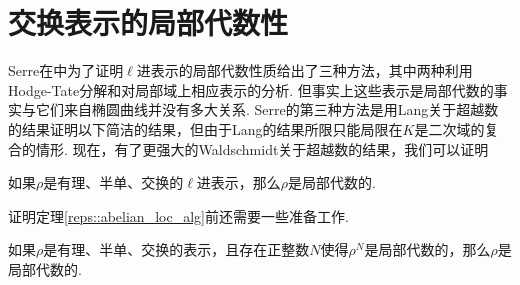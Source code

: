 \section{交换表示的局部代数性}

Serre在\parencite{serre1997abelian}中为了证明$\ell$进表示的局部代数性质给出了三种方法，其中两种利用Hodge-Tate分解和对局部域上相应表示的分析. 但事实上这些表示是局部代数的事实与它们来自椭圆曲线并没有多大关系. Serre的第三种方法是用Lang关于超越数的结果证明以下简洁的结果，但由于Lang的结果所限只能局限在$K$是二次域的复合的情形. 现在，有了更强大的Waldschmidt关于超越数的结果，我们可以证明

\begin{cthm}
    如果$\rho$是有理、半单、交换的$\ell$进表示，那么$\rho$是局部代数的. \label{reps::abelian_loc_alg}
\end{cthm}

证明定理\ref{reps::abelian_loc_alg}前还需要一些准备工作.

\begin{cprop}
    如果$\rho$是有理、半单、交换的表示，且存在正整数$N$使得$\rho^N$是局部代数的，那么$\rho$是局部代数的. \label{reps::power_N}
\end{cprop}


